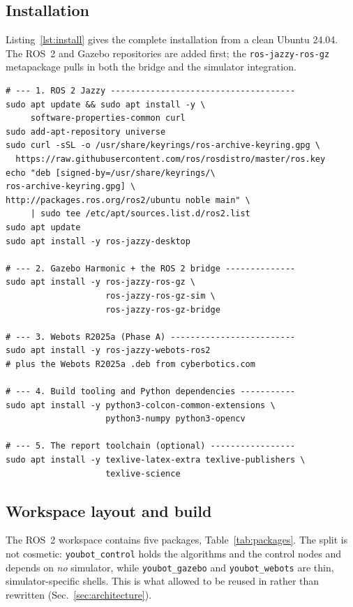 \subsection{Installation}

Listing~\ref{lst:install} gives the complete installation from a clean
Ubuntu 24.04. The ROS~2 and Gazebo repositories are added first; the
\texttt{ros-jazzy-ros-gz} metapackage pulls in both the bridge and the
simulator integration.

\begin{lstlisting}[style=bash,caption={Full installation on a clean
Ubuntu 24.04.},label={lst:install}]
# --- 1. ROS 2 Jazzy -------------------------------------
sudo apt update && sudo apt install -y \
     software-properties-common curl
sudo add-apt-repository universe
sudo curl -sSL -o /usr/share/keyrings/ros-archive-keyring.gpg \
  https://raw.githubusercontent.com/ros/rosdistro/master/ros.key
echo "deb [signed-by=/usr/share/keyrings/\
ros-archive-keyring.gpg] \
http://packages.ros.org/ros2/ubuntu noble main" \
     | sudo tee /etc/apt/sources.list.d/ros2.list
sudo apt update
sudo apt install -y ros-jazzy-desktop

# --- 2. Gazebo Harmonic + the ROS 2 bridge --------------
sudo apt install -y ros-jazzy-ros-gz \
                    ros-jazzy-ros-gz-sim \
                    ros-jazzy-ros-gz-bridge

# --- 3. Webots R2025a (Phase A) -------------------------
sudo apt install -y ros-jazzy-webots-ros2
# plus the Webots R2025a .deb from cyberbotics.com

# --- 4. Build tooling and Python dependencies -----------
sudo apt install -y python3-colcon-common-extensions \
                    python3-numpy python3-opencv

# --- 5. The report toolchain (optional) -----------------
sudo apt install -y texlive-latex-extra texlive-publishers \
                    texlive-science
\end{lstlisting}

\subsection{Workspace layout and build}

The ROS~2 workspace contains five packages, Table~\ref{tab:packages}.
The split is not cosmetic: \texttt{youbot\_control} holds the algorithms
and the control nodes and depends on \emph{no} simulator, while
\texttt{youbot\_gazebo} and \texttt{youbot\_webots} are thin,
simulator-specific shells. This is what allowed \phaseA{} to be reused
in \phaseB{} rather than rewritten (Sec.~\ref{sec:architecture}).

